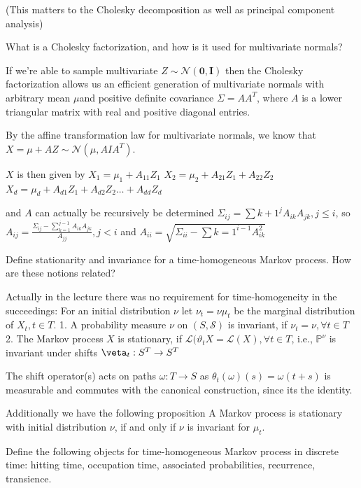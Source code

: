 (This matters to the Cholesky decomposition as well as principal component analysis)

What is a Cholesky factorization, and how is it used for multivariate normals?

If we're able to sample multivariate \( Z \sim \mathcal{N}(\mathbf{0}, \mathbf{I}) \) then the Cholesky factorization
allows us an efficient generation of multivariate normals with arbitrary mean \( \mu \)and positive definite covariance \( \Sigma = AA^{T}\),
where \( A \) is a lower triangular matrix with real and positive diagonal entries.

By the affine transformation law for multivariate normals, we know that \( X = \mu + AZ \sim \mathcal{N}(\mu, AIA^{T}) \).

\( X \) is then given by 
\( X_1 = \mu_1 + A_{11} Z_1 \)
\( X_2 = \mu_2 + A_{21} Z_1 + A_{22} Z_{2}\)
\( X_d = \mu_d + A_{d1} Z_1 + A_{d2} Z_{2} \dots + A_{dd}Z_d\)

and \( A \) can actually be recursively be determined
\( \Sigma_{ij} = \sum{k+1}^{j} A_{ik}A_{jk}, j \leq i \), so \( A_{ij} = \frac{\Sigma_{ij}- \sum^{j-1}_{k=1}A_{ik}A_{jk}}{A_{jj}}, j < i \)
and \( A_{ii} = \sqrt{\Sigma_{ii} - \sum{k=1}^{i-1} A^2_{ik}} \)


Define stationarity and invariance for a time-homogeneous Markov process. How
are these notions related?

Actually in the lecture there was no requirement for time-homogeneity in the succeedings: 
For an initial distribution \( \nu \) let \( \nu_t = \nu \mu_t \) be the marginal distribution of \( X_t, t \in T \).
1. A probability measure \( \nu \) on \( (S, \mathcal{S}) \) is invariant, if \(\nu_t = \nu, \forall t \in T\)
2. The Markov process \( X \) is stationary, if \( \mathcal{L}(\vartheta_t X = \mathcal{L}(X), \forall t \in T \), i.e., \( \mathbb{P}^\nu \) is invariant under shifts
\( \veta_t : S^T \to S^T \)

The shift operator(s) acts on paths \( \omega : T \to S \) as \( \theta_t(\omega)(s) = \omega(t + s) \) is measurable and commutes
with the canonical construction, since its the identity.

Additionally we have the following proposition 
A Markov process is stationary with initial distribution \( \nu \), if and only if \( \nu \) is invariant for \( \mu_t \).

Define the following objects for time-homogeneous Markov process in discrete time:
hitting time, occupation time, associated probabilities, recurrence, transience.

